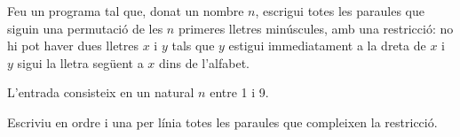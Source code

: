 

\Statement

Feu un programa tal que, donat un nombre $n$,
escrigui totes les paraules
que siguin una permutació de les $n$ primeres lletres minúscules,
amb una restricció:
no hi pot haver dues lletres $x$ i $y$
tals que $y$ estigui immediatament a la dreta de $x$
i $y$ sigui la lletra següent a $x$ dins de l'alfabet.


\Input

L'entrada consisteix en un natural $n$ entre 1 i 9.


\Output

Escriviu en ordre i una per línia
totes les paraules que compleixen la restricció.


\Sample


